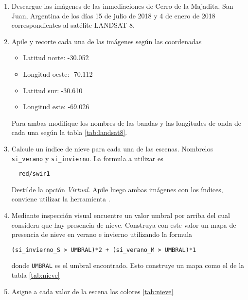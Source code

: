 \begin{enumerate}
\item Descargue las imágenes de las inmediaciones de Cerro de la Majadita, San Juan, Argentina de los días 15 de julio de 2018 y 4 de enero de 2018 correspondientes al satélite LANDSAT 8.

\item Apile y recorte cada una de las imágenes según las coordenadas

\begin{itemize}
    \item Latitud norte: -30.052
    \item Longitud oeste: -70.112
    \item Latitud sur: -30.610
    \item Longitud este: -69.026
\end{itemize}

Para ambas modifique los nombres de las bandas y las longitudes de onda de cada una según la tabla \ref{tab:landsat8}.

\item Calcule un índice de nieve para cada una de las escenas. Nombrelos \texttt{si\_verano} y \texttt{si\_invierno}. La formula a utilizar es

\begin{verbatim}
  red/swir1
\end{verbatim}

Destilde la opción \emph{Virtual}. Apile luego ambas imágenes con los índices, conviene utilizar la herramienta .

\item Mediante inspección visual encuentre un valor umbral por arriba del cual considera que hay presencia de nieve. Construya con este valor un mapa de presencia de nieve en verano e invierno utilizando la formula

\begin{verbatim}
(si_invierno_S > UMBRAL)*2 + (si_verano_M > UMBRAL)*1
\end{verbatim}

donde \texttt{UMBRAL} es el umbral encontrado. Esto construye un mapa como el de la tabla \ref{tab:nieve}

\item Asigne a cada valor de la escena los colores \ref{tab:nieve}


\end{enumerate}
